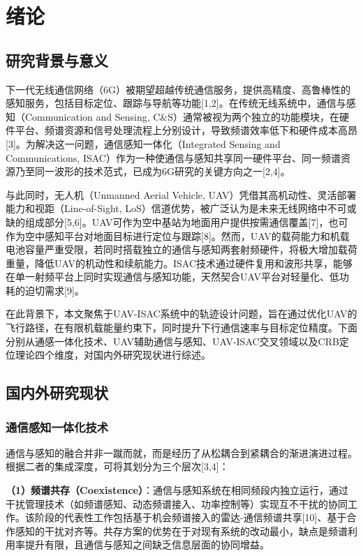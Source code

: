 \chapter{绪论}

\section{研究背景与意义}

下一代无线通信网络（6G）被期望超越传统通信服务，提供高精度、高鲁棒性的感知服务，包括目标定位、跟踪与导航等功能[1,2]。在传统无线系统中，通信与感知（Communication and Sensing, C\&S）通常被视为两个独立的功能模块，在硬件平台、频谱资源和信号处理流程上分别设计，导致频谱效率低下和硬件成本高昂[3]。为解决这一问题，通信感知一体化（Integrated Sensing and Communications, ISAC）作为一种使通信与感知共享同一硬件平台、同一频谱资源乃至同一波形的技术范式，已成为6G研究的关键方向之一[2,4]。

与此同时，无人机（Unmanned Aerial Vehicle, UAV）凭借其高机动性、灵活部署能力和视距（Line-of-Sight, LoS）信道优势，被广泛认为是未来无线网络中不可或缺的组成部分[5,6]。UAV可作为空中基站为地面用户提供按需通信覆盖[7]，也可作为空中感知平台对地面目标进行定位与跟踪[8]。然而，UAV的载荷能力和机载电池容量严重受限，若同时搭载独立的通信与感知两套射频硬件，将极大增加载荷重量，降低UAV的机动性和续航能力。ISAC技术通过硬件复用和波形共享，能够在单一射频平台上同时实现通信与感知功能，天然契合UAV平台对轻量化、低功耗的迫切需求[9]。

在此背景下，本文聚焦于UAV-ISAC系统中的轨迹设计问题，旨在通过优化UAV的飞行路径，在有限机载能量约束下，同时提升下行通信速率与目标定位精度。下面分别从通感一体化技术、UAV辅助通信与感知、UAV-ISAC交叉领域以及CRB定位理论四个维度，对国内外研究现状进行综述。

\section{国内外研究现状}

\subsection{通信感知一体化技术}

通信与感知的融合并非一蹴而就，而是经历了从松耦合到紧耦合的渐进演进过程。根据二者的集成深度，可将其划分为三个层次[3,4]：

\textbf{（1）频谱共存（Coexistence）}：通信与感知系统在相同频段内独立运行，通过干扰管理技术（如频谱感知、动态频谱接入、功率控制等）实现互不干扰的协同工作。该阶段的代表性工作包括基于机会频谱接入的雷达-通信频谱共享[10]、基于合作感知的干扰对齐等。共存方案的优势在于对现有系统的改动最小，缺点是频谱利用率提升有限，且通信与感知之间缺乏信息层面的协同增益。

